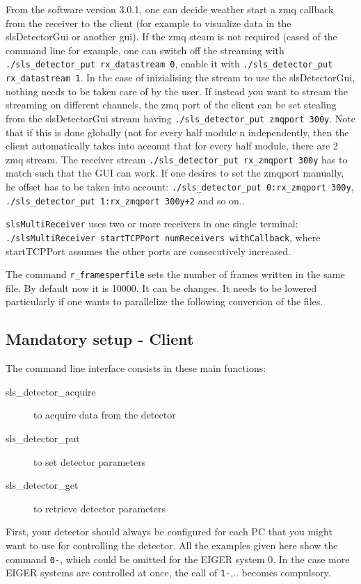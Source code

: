 \documentclass{article}
\begin{document}
From the software version 3.0.1, one can decide weather start a zmq callback from the receiver to the client (for example to visualize data in the slsDetectorGui or another gui). If the zmq steam is not required (cased of the command line for example, one can switch off the streaming with {\tt{./sls\_detector\_put rx\_datastream 0}}, enable it with {\tt{./sls\_detector\_put rx\_datastream 1}}. In the case of inizialising the stream to use the slsDetectorGui, nothing needs to be taken care of by the user. If instead you want to stream the streaming on different channels, the zmq port of the client can be set stealing from the slsDetectorGui stream having {\tt{./sls\_detector\_put zmqport 300y}}. Note that if this is done globally (not for every half module n independently, then the client automatically takes into account that for every half module, there are 2 zmq stream. The receiver stream {\tt{./sls\_detector\_put rx\_zmqport 300y}} has to match such that the GUI can work. 
If one desires to set the zmqport manually, he offset has to be taken into account: {\tt{./sls\_detector\_put 0:rx\_zmqport 300y}}, {\tt{./sls\_detector\_put 1:rx\_zmqport 300y+2}} and so on..


{\tt{slsMultiReceiver}} uses two or more receivers in one single terminal: {\tt{./slsMultiReceiver startTCPPort numReceivers withCallback}}, where startTCPPort assumes the other ports are consecutively increased.

The command {\tt{r\_framesperfile}} sets the number of frames written in the same file. By default now it is 10000. It can be changes. It needs to be lowered particularly if one wants to parallelize the following conversion of the files. 


\subsection{Mandatory setup - Client}

The command line interface consists in these main functions:
\begin{description}
\item[sls\_detector\_acquire] to acquire data from the detector
\item[sls\_detector\_put] to set detector parameters
\item[sls\_detector\_get] to retrieve detector parameters
\end{description}

First, your detector should always be configured for each PC that you might want to use for controlling the detector. All the examples given here show the command {\tt{0-}}, which could be omitted for the EIGER system $0$. In the case more EIGER systems are controlled at once, the call of {\tt{1-}},.. becomes compulsory. 
\end{document}
